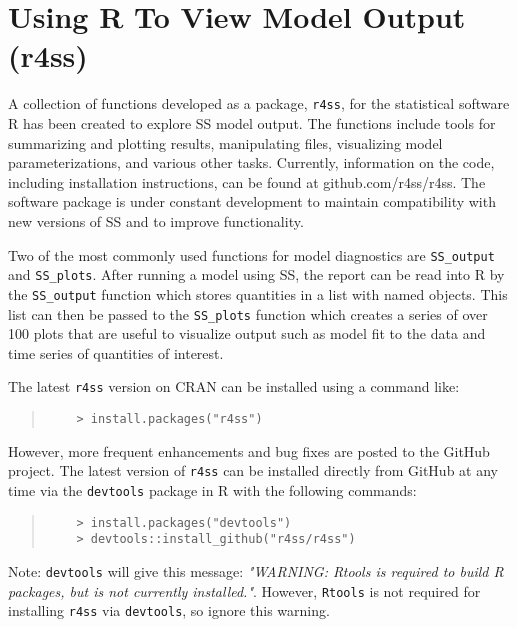 
\section{Using R To View Model Output (r4ss)}\label{r4ss}

A collection of functions developed as a package, \texttt{r4ss}, for the statistical software R has been created to explore SS model output.  The functions include tools for summarizing and plotting results, manipulating files, visualizing model parameterizations, and various other tasks.  Currently, information on the code, including installation instructions, can be found at github.com/r4ss/r4ss.  The software package is under constant development to maintain compatibility with new versions of SS and to improve functionality.

Two of the most commonly used functions for model diagnostics are \texttt{SS\_output} and \texttt{SS\_plots}.  After running a model using SS, the report can be read into R by the \texttt{SS\_output} function which stores quantities in a list with named objects.  This list can then be passed to the \texttt{SS\_plots} function which creates a series of over 100 plots that are useful to visualize output such as model fit to the data and time series of quantities of interest.

The latest \texttt{r4ss} version on CRAN can be installed using a command like:

\begin{quote}
	\begin{verbatim}
	> install.packages("r4ss")
	\end{verbatim}
\end{quote}


However, more frequent enhancements and bug fixes are posted to the GitHub project.  The latest version of \texttt{r4ss} can be installed directly from GitHub at any time via the \texttt{devtools} package in R with the following commands:

\begin{quote}
	\begin{verbatim}
	> install.packages("devtools")
	> devtools::install_github("r4ss/r4ss")
	\end{verbatim}
\end{quote}

Note: \texttt{devtools} will give this message: \textit{"WARNING: Rtools is required to build R packages, but is not currently installed."}. However, \texttt{Rtools} is not required for installing \texttt{r4ss} via \texttt{devtools}, so ignore this warning.

